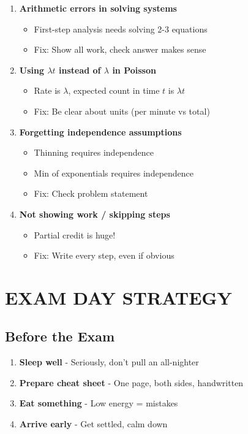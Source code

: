 \documentclass[10pt,letterpaper]{article}
\begin{document}
\begin{enumerate}[leftmargin=*]
  \item \textbf{Arithmetic errors in solving systems}
    \begin{itemize}
      \item First-step analysis needs solving 2-3 equations
      \item Fix: Show all work, check answer makes sense
    \end{itemize}

  \item \textbf{Using $\lambda t$ instead of $\lambda$ in Poisson}
    \begin{itemize}
      \item Rate is $\lambda$, expected count in time $t$ is $\lambda t$
      \item Fix: Be clear about units (per minute vs total)
    \end{itemize}

  \item \textbf{Forgetting independence assumptions}
    \begin{itemize}
      \item Thinning requires independence
      \item Min of exponentials requires independence
      \item Fix: Check problem statement
    \end{itemize}

  \item \textbf{Not showing work / skipping steps}
    \begin{itemize}
      \item Partial credit is huge!
      \item Fix: Write every step, even if obvious
    \end{itemize}
\end{enumerate}

\newpage

\section{EXAM DAY STRATEGY}

\subsection{Before the Exam}

\begin{enumerate}[leftmargin=*]
  \item \textbf{Sleep well} - Seriously, don't pull an all-nighter
  \item \textbf{Prepare cheat sheet} - One page, both sides, handwritten
  \item \textbf{Eat something} - Low energy = mistakes
  \item \textbf{Arrive early} - Get settled, calm down
\end{enumerate}
\end{document}
